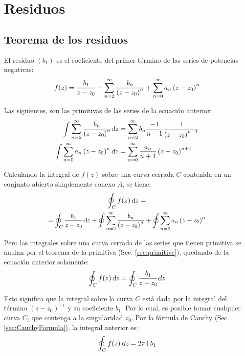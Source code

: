 \documentclass[a5paper,12pt,twoside]{book}
\begin{document}
\chapter{Residuos}


\section{Teorema de los residuos}
\label{sec:residue}

El residuo $(b_1)$ es el coeficiente del primer término de las series de potencias negativas:
\begin{equation*}
    f(z) = \frac{b_1}{z-z_0} + \sum_{n=2}^\infty \frac{b_n}{\left(z-z_0\right)^n} + \sum_{n=0}^\infty a_n \left(z-z_0\right)^n
\end{equation*}

Las siguientes, son las primitivas de las series de la ecuación anterior:
\begin{align*}
    \int \sum_{n=2}^\infty \frac{b_n}{\left(z-z_0\right)^n} \textsl{d} z
    &= \sum_{n=2}^\infty b_n \frac{-1}{n-1} \frac{1}{\left(z-z_0\right)^{n-1}}
    \\
    \int \sum_{n=0}^\infty a_n \left(z-z_0\right)^n \textsl{d} z
    &= \sum_{n=0}^\infty \frac{a_n}{n+1} \left(z-z_0\right)^{n+1}
\end{align*}

Calculando la integral de $f(z)$ sobre una curva cerrada $C$ contenida en un conjunto abierto simplemente conexo $A$, se tiene:
\begin{multline*}
    \oint_C f(z) \, \dif z =
    \\
    \scale{0.96}{
    = \oint_C \frac{b_1}{z-z_0} \dif z + \oint \sum_{\nth=2}^\infty \frac{b_\nth}{\left(z-z_0\right)^n} + \oint \sum_{\nth=0}^\infty a_\nth \left(z-z_0\right)^\nth
    }
\end{multline*}

Pero las integrales sobre una curva cerrada de las series que tienen primitiva se anulan por el teorema de la primitiva (Sec. \ref{sec:primitive}), quedando de la ecuación anterior solamente:
\begin{equation*}
    \oint_C f(z) \, \textsl{d} z = \oint_C \frac{b_1}{z-z_0} \textsl{d} z
\end{equation*}

Esto significa que la integral sobre la curva $C$ está dada por la integral del término $(z-z_0)^{-1}$ y su coeficiente $b_1$. Por lo cual, es posible tomar cualquier curva $C_i$ que contenga a la singularidad $z_0$. Por la fórmula de Cauchy (Sec. \ref{sec:CauchyFormula}), la integral anterior es:
\begin{equation*}
    \oint_C f(z) \, \textsl{d} z = 2 \pi \, \mathrm{i}\mkern1mu \, b_1
\end{equation*}
\end{document}
